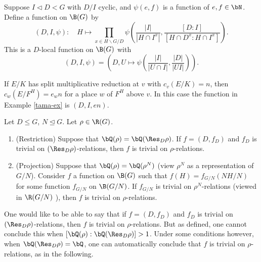 \begin{defn}\cite[Definition 2.35]{reg-const}\label{D-I-fn}
    Suppose $I \triangleleft D < G$ with $D / I$ cyclic, and $\psi(e,f)$ is a function of $e, f \in \bN$. Define a function on $\B(G)$ by 
    \[ \left(D, I, \psi\right) \colon \quad H \mapsto \prod_{x \in H\backslash G / D} \psi\left(\frac{|I|}{|H \cap I^x|}, \frac{[D : I]}{[H \cap D^x : H \cap I^x]}\right). \]
    This is a $D$-local function on $\B(G)$ with
    \[ (D, I, \psi) = \left(D, U \mapsto \psi\left(\frac{|I|}{|U \cap I|}, \frac{|D|}{|UI|}\right)\right). \]
\end{defn}

\begin{example}
    If $E / K$ has split multiplicative reduction at $v$ with $c_v(E / K) = n$, then $c_w(E / F^H) = e_w n$ for a place $w$ of $F^H$ above $v$. In this case the function in Example \ref{tama-ex} is $(D, I, e n)$. 
\end{example}


\begin{prop}
    Let $D \leq G$, $N \trianglelefteq G$. Let $\rho \in \R(G)$.
    \begin{enumerate}
        \item (Restriction) Suppose that $\bQ(\rho) = \bQ(\Res_D \rho)$. If $f = (D, f_D)$ and $f_D$ is trivial on $(\Res_D \rho)$-relations, then $f$ is trivial on $\rho$-relations.
        \item (Projection) Suppose that $\bQ(\rho) = \bQ(\rho^N)$ (view $\rho^N$ as a representation of $G / N$). Consider $f$ a function on $\B(G)$ such that $f(H) = f_{G / N}(N H / N)$ for some function $f_{G / N}$ on $\B(G / N)$. If $f_{G / N}$ is trivial on $\rho^N$-relations (viewed in $\R(G / N)$ ), then $f$ is trivial on $\rho$-relations.
    \end{enumerate}
\end{prop}

 One would like to be able to say that if $f = (D, f_D)$ and $f_D$ is trivial on $(\Res_D \rho)$-relations, then $f$ is trivial on $\rho$-relations. But as defined, one cannot conclude this when $[\bQ(\rho) : \bQ(\Res_D \rho) ] > 1$. Under some conditions however, when $\bQ(\Res_D \rho) = \bQ$, one can automatically conclude that $f$ is trivial on $\rho$-relations, as in the following.

